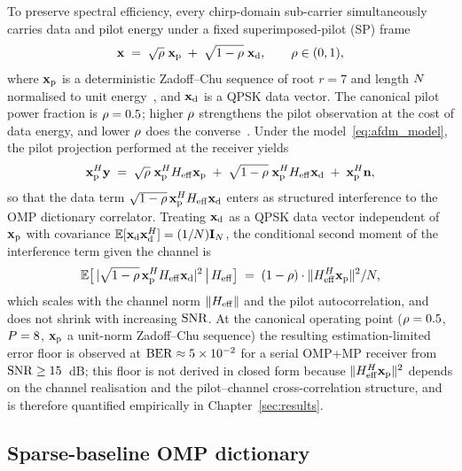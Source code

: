 To preserve spectral efficiency, every chirp-domain sub-carrier simultaneously carries data and pilot energy under a fixed superimposed-pilot (SP) frame
\begin{equation}
\mathbf{x} \;=\; \sqrt{\rho}\; \mathbf{x}_{\mathrm{p}} \;+\; \sqrt{1 - \rho}\; \mathbf{x}_{\mathrm{d}}, \qquad \rho \in (0, 1), \label{eq:sp_frame}
\end{equation}
where $\mathbf{x}_{\mathrm{p}}$ is a deterministic Zadoff--Chu sequence of root $r = 7$ and length $N$ normalised to unit energy~\cite{kaleh2005zadoffchu}, and $\mathbf{x}_{\mathrm{d}}$ is a QPSK data vector. The canonical pilot power fraction is $\rho = 0.5$; higher $\rho$ strengthens the pilot observation at the cost of data energy, and lower $\rho$ does the converse~\cite{orozco2011superimposed,tugnait2006superimposed}. Under the model~\eqref{eq:afdm_model}, the pilot projection performed at the receiver yields
\begin{equation}
\mathbf{x}_{\mathrm{p}}^H \mathbf{y} \;=\; \sqrt{\rho}\; \mathbf{x}_{\mathrm{p}}^H H_{\mathrm{eff}} \mathbf{x}_{\mathrm{p}} \;+\; \sqrt{1 - \rho}\; \mathbf{x}_{\mathrm{p}}^H H_{\mathrm{eff}} \mathbf{x}_{\mathrm{d}} \;+\; \mathbf{x}_{\mathrm{p}}^H \mathbf{n}, \label{eq:pilot_projection}
\end{equation}
so that the data term $\sqrt{1 - \rho}\, \mathbf{x}_{\mathrm{p}}^H H_{\mathrm{eff}} \mathbf{x}_{\mathrm{d}}$ enters as structured interference to the OMP dictionary correlator. Treating $\mathbf{x}_{\mathrm{d}}$ as a QPSK data vector independent of $\mathbf{x}_{\mathrm{p}}$ with covariance $\mathbb{E}[\mathbf{x}_{\mathrm{d}} \mathbf{x}_{\mathrm{d}}^H] = (1/N) \mathbf{I}_{N}$, the conditional second moment of the interference term given the channel is
\begin{equation}
\mathbb{E}\bigl[\,|\sqrt{1-\rho}\, \mathbf{x}_{\mathrm{p}}^H H_{\mathrm{eff}} \mathbf{x}_{\mathrm{d}}|^2\,\big|\,H_{\mathrm{eff}}\bigr] \;=\; (1-\rho) \cdot \|H_{\mathrm{eff}}^H \mathbf{x}_{\mathrm{p}}\|^2 / N, \label{eq:interferencevar}
\end{equation}
which scales with the channel norm $\|H_{\mathrm{eff}}\|$ and the pilot autocorrelation, and does not shrink with increasing $\mathrm{SNR}$. At the canonical operating point ($\rho = 0.5$, $P = 8$, $\mathbf{x}_{\mathrm{p}}$ a unit-norm Zadoff--Chu sequence) the resulting estimation-limited error floor is observed at $\mathrm{BER} \approx 5 \times 10^{-2}$ for a serial OMP+MP receiver from $\mathrm{SNR} \geq 15$~dB; this floor is not derived in closed form because $\|H_{\mathrm{eff}}^H \mathbf{x}_{\mathrm{p}}\|^2$ depends on the channel realisation and the pilot--channel cross-correlation structure, and is therefore quantified empirically in Chapter~\ref{sec:results}.

\subsection{Sparse-baseline OMP dictionary}
\label{ssec:dictionary}

